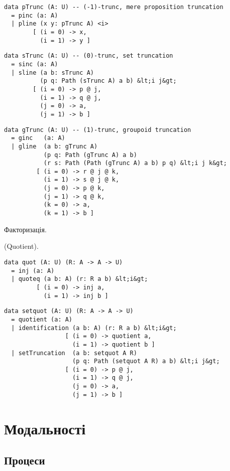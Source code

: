 \begin{lstlisting}
data pTrunc (A: U) -- (-1)-trunc, mere proposition truncation
  = pinc (a: A)
  | pline (x y: pTrunc A) <i>
        [ (i = 0) -> x,
          (i = 1) -> y ]
\end{lstlisting}

\begin{lstlisting}
data sTrunc (A: U) -- (0)-trunc, set truncation
  = sinc (a: A)
  | sline (a b: sTrunc A)
          (p q: Path (sTrunc A) a b) &lt;i j&gt;
        [ (i = 0) -> p @ j,
          (i = 1) -> q @ j,
          (j = 0) -> a,
          (j = 1) -> b ]
\end{lstlisting}

\begin{lstlisting}
data gTrunc (A: U) -- (1)-trunc, groupoid truncation
  = ginc   (a: A)
  | gline  (a b: gTrunc A)
           (p q: Path (gTrunc A) a b)
           (r s: Path (Path (gTrunc A) a b) p q) &lt;i j k&gt;
         [ (i = 0) -> r @ j @ k,
           (i = 1) -> s @ j @ k,
           (j = 0) -> p @ k,
           (j = 1) -> q @ k,
           (k = 0) -> a,
           (k = 1) -> b ]
\end{lstlisting}

Факторизація.

\begin{definition} (Quotient).
\begin{lstlisting}
data quot (A: U) (R: A -> A -> U)
  = inj (a: A)
  | quoteq (a b: A) (r: R a b) &lt;i&gt;
         [ (i = 0) -> inj a,
           (i = 1) -> inj b ]
\end{lstlisting}
\begin{lstlisting}
data setquot (A: U) (R: A -> A -> U)
  = quotient (a: A)
  | identification (a b: A) (r: R a b) &lt;i&gt;
                 [ (i = 0) -> quotient a,
                   (i = 1) -> quotient b ]
  | setTruncation  (a b: setquot A R)
                   (p q: Path (setquot A R) a b) &lt;i j&gt;
                 [ (i = 0) -> p @ j,
                   (i = 1) -> q @ j,
                   (j = 0) -> a,
                   (j = 1) -> b ]
\end{lstlisting}
\end{definition}


\section{Модальності}

\subsection{Процеси}

